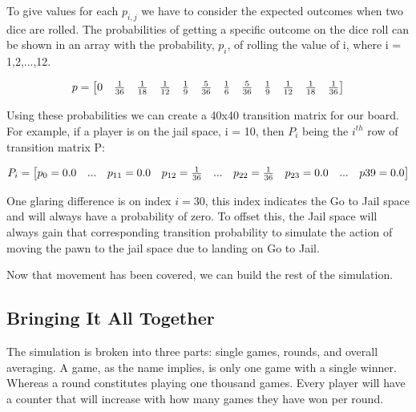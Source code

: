\documentclass{article}
\begin{document}
To give values for each $p_{i,j}$ we have to consider the expected outcomes when two dice are rolled.  The probabilities of getting a specific outcome on the dice roll can be shown in an array with the probability, $p_i$, of rolling the value of i, where i = 1,2,...,12.

$$
\setcounter{MaxMatrixCols}{20}
p=
\begin{bmatrix}
0&\frac{1}{36}&\frac{1}{18}&\frac{1}{12}&\frac{1}{9}&\frac{5}{36}&\frac{1}{6}&\frac{5}{36}&\frac{1}{9}&\frac{1}{12}&\frac{1}{18}&\frac{1}{36}\\
\end{bmatrix}
$$

Using these probabilities we can create a 40x40 transition matrix for our board.  For example, if a player is on the jail space, i = 10,  then $P_i$ being the $i^{th}$ row of transition matrix P:

$$
\setcounter{MaxMatrixCols}{20}
P_i=
\begin{bmatrix}
p_0 = 0.0& ... & p_{11} = 0.0 & p_{12} = \frac{1}{36}&...& p_{22} = \frac{1}{36}& p_{23} = 0.0 & ... & p{39} = 0.0\\
\end{bmatrix}
$$

One glaring difference is on index $i = 30$, this index indicates the Go to Jail space and will always have a probability of zero.  To offset this, the Jail space will always gain that corresponding transition probability to simulate the action of moving the pawn to the jail space due to landing on Go to Jail.  

Now that movement has been covered, we can build the rest of the simulation.

\subsection{Bringing It All Together}

The simulation is broken into three parts: single games, rounds, and overall averaging.  A game, as the name implies, is only one game with a single winner.  Whereas a round constitutes playing one thousand games.  Every player will have a counter that will increase with how many games they have won per round.
\end{document}
